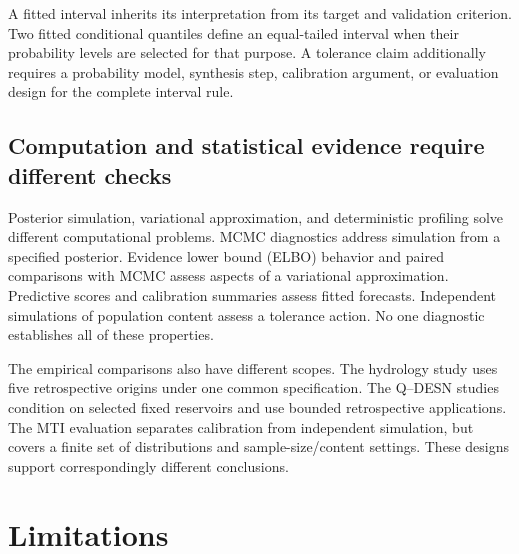 A fitted interval inherits its interpretation from its target and validation
criterion. Two fitted conditional quantiles define an equal-tailed interval
when their probability levels are selected for that purpose. A tolerance
claim additionally requires a probability model, synthesis step, calibration
argument, or evaluation design for the complete interval rule.

\subsection{Computation and statistical evidence require different checks}

Posterior simulation, variational approximation, and deterministic profiling
solve different computational problems. MCMC diagnostics address simulation
from a specified posterior. Evidence lower bound (ELBO) behavior and paired comparisons with MCMC
assess aspects of a variational approximation. Predictive scores and
calibration summaries assess fitted forecasts. Independent simulations of
population content assess a tolerance action. No one diagnostic establishes
all of these properties.

The empirical comparisons also have different scopes. The hydrology study uses
five retrospective origins under one common specification. The Q--DESN studies
condition on selected fixed reservoirs and use bounded retrospective
applications. The MTI evaluation separates calibration from independent
simulation, but covers a finite set of distributions and sample-size/content
settings. These designs support correspondingly different conclusions.

\section{Limitations}
\label{sec:synthesis-limitations}

